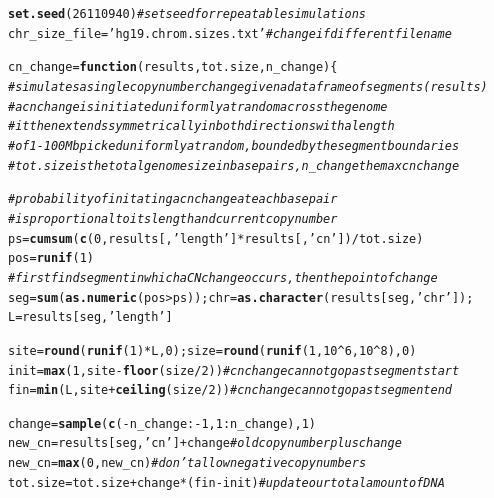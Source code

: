 \documentclass[12pt]{article}\usepackage[]{graphicx}\usepackage[]{color}
\makeatletter
\newcommand{\hlnum}[1]{\textcolor[rgb]{0.686,0.059,0.569}{#1}}%
\newcommand{\hlstr}[1]{\textcolor[rgb]{0.192,0.494,0.8}{#1}}%
\newcommand{\hlcom}[1]{\textcolor[rgb]{0.678,0.584,0.686}{\textit{#1}}}%
\newcommand{\hlopt}[1]{\textcolor[rgb]{0,0,0}{#1}}%
\newcommand{\hlstd}[1]{\textcolor[rgb]{0.345,0.345,0.345}{#1}}%
\newcommand{\hlkwa}[1]{\textcolor[rgb]{0.161,0.373,0.58}{\textbf{#1}}}%
\newcommand{\hlkwb}[1]{\textcolor[rgb]{0.69,0.353,0.396}{#1}}%
\newcommand{\hlkwc}[1]{\textcolor[rgb]{0.333,0.667,0.333}{#1}}%
\newcommand{\hlkwd}[1]{\textcolor[rgb]{0.737,0.353,0.396}{\textbf{#1}}}%
\newenvironment{kframe}{%
 \def\at@end@of@kframe{}%
 \ifinner\ifhmode%
  \def\at@end@of@kframe{\end{minipage}}%
  \begin{minipage}{\columnwidth}%
 \fi\fi%
 \def\FrameCommand##1{\hskip\@totalleftmargin \hskip-\fboxsep
 \colorbox{shadecolor}{##1}\hskip-\fboxsep
     \hskip-\linewidth \hskip-\@totalleftmargin \hskip\columnwidth}%
 \MakeFramed {\advance\hsize-\width
   \@totalleftmargin\z@ \linewidth\hsize
   \@setminipage}}%
 {\par\unskip\endMakeFramed%
 \at@end@of@kframe}
\makeatother
\begin{document}
\begin{kframe}
\begin{alltt}
\hlkwd{set.seed}\hlstd{(}\hlnum{26110940}\hlstd{)} \hlcom{#set seed for repeatable simulations}
\hlstd{chr_size_file} \hlkwb{=} \hlstr{'hg19.chrom.sizes.txt'} \hlcom{#change if different file name}

\hlstd{cn_change} \hlkwb{=} \hlkwa{function}\hlstd{(}\hlkwc{results}\hlstd{,} \hlkwc{tot.size}\hlstd{,} \hlkwc{n_change}\hlstd{)\{}
  \hlcom{#simulates a single copy number change given a data frame of segments (results)}
  \hlcom{#a cn change is initiated uniformly at random across the genome}
  \hlcom{#it then extends symmetrically in both directions with a length}
  \hlcom{#of 1-100 Mb picked uniformly at random, bounded by the segment boundaries}
  \hlcom{#tot.size is the total genome size in basepairs, n_change the max cn change}

  \hlcom{#probability of initating a cn change at each basepair}
  \hlcom{#is proportional to its length and current copy number}
  \hlstd{ps} \hlkwb{=} \hlkwd{cumsum}\hlstd{(} \hlkwd{c}\hlstd{(}\hlnum{0}\hlstd{, results[,}\hlstr{'length'}\hlstd{]}\hlopt{*}\hlstd{results[,}\hlstr{'cn'}\hlstd{])} \hlopt{/} \hlstd{tot.size )}
  \hlstd{pos} \hlkwb{=} \hlkwd{runif}\hlstd{(}\hlnum{1}\hlstd{)}
  \hlcom{#first find segment in which a CN change occurs, then the point of change}
  \hlstd{seg} \hlkwb{=} \hlkwd{sum} \hlstd{(}\hlkwd{as.numeric}\hlstd{(pos} \hlopt{>} \hlstd{ps)); chr} \hlkwb{=} \hlkwd{as.character}\hlstd{(results[seg,} \hlstr{'chr'}\hlstd{]);}
  \hlstd{L} \hlkwb{=} \hlstd{results[seg,} \hlstr{'length'}\hlstd{]}

  \hlstd{site} \hlkwb{=} \hlkwd{round}\hlstd{(}\hlkwd{runif}\hlstd{(}\hlnum{1}\hlstd{)}\hlopt{*}\hlstd{L,}\hlnum{0}\hlstd{); size} \hlkwb{=} \hlkwd{round}\hlstd{(}\hlkwd{runif}\hlstd{(}\hlnum{1}\hlstd{,} \hlnum{10}\hlopt{^}\hlnum{6}\hlstd{,} \hlnum{10}\hlopt{^}\hlnum{8}\hlstd{),} \hlnum{0}\hlstd{)}
  \hlstd{init} \hlkwb{=} \hlkwd{max}\hlstd{(}\hlnum{1}\hlstd{, site}\hlopt{-}\hlkwd{floor}\hlstd{(size}\hlopt{/}\hlnum{2}\hlstd{))} \hlcom{#cn change cannot go past segment start}
  \hlstd{fin} \hlkwb{=} \hlkwd{min}\hlstd{(L, site}\hlopt{+}\hlkwd{ceiling}\hlstd{(size}\hlopt{/}\hlnum{2}\hlstd{))} \hlcom{#cn change cannot go past segment end}

  \hlstd{change} \hlkwb{=} \hlkwd{sample}\hlstd{(} \hlkwd{c}\hlstd{(} \hlopt{-}\hlstd{n_change}\hlopt{:-}\hlnum{1} \hlstd{,} \hlnum{1}\hlopt{:}\hlstd{n_change ),} \hlnum{1}\hlstd{)}
  \hlstd{new_cn} \hlkwb{=} \hlstd{results[seg,}\hlstr{'cn'}\hlstd{]}\hlopt{+}\hlstd{change} \hlcom{#old copy number plus change}
  \hlstd{new_cn} \hlkwb{=} \hlkwd{max}\hlstd{(}\hlnum{0}\hlstd{, new_cn)} \hlcom{# don't allow negative copy numbers}
  \hlstd{tot.size} \hlkwb{=} \hlstd{tot.size} \hlopt{+} \hlstd{change}\hlopt{*}\hlstd{(fin}\hlopt{-}\hlstd{init)} \hlcom{#update our total amount of DNA}


\end{alltt}
\end{kframe}
\end{document}
